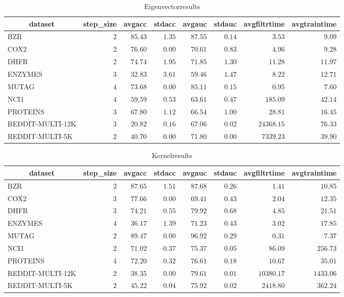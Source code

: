 \begin{table}[!tbp]
\caption{Eigenvectorresults\label{Eigenvectorresults}} 
{\centering
\begin{tabular}{lrrrrrrr}
\hline\hline
\multicolumn{1}{c}{dataset}&\multicolumn{1}{c}{step_size}&\multicolumn{1}{c}{avgacc}&\multicolumn{1}{c}{stdacc}&\multicolumn{1}{c}{avgauc}&\multicolumn{1}{c}{stdauc}&\multicolumn{1}{c}{avgfiltrtime}&\multicolumn{1}{c}{avgtraintime}\tabularnewline
\hline
BZR&$2$&$85.43$&$1.35$&$87.55$&$0.14$&$    3.53$&$ 9.09$\tabularnewline
COX2&$2$&$76.60$&$0.00$&$70.61$&$0.83$&$    4.96$&$ 9.28$\tabularnewline
DHFR&$2$&$74.74$&$1.95$&$71.85$&$1.30$&$   11.28$&$11.97$\tabularnewline
ENZYMES&$3$&$32.83$&$3.61$&$59.46$&$1.47$&$    8.22$&$12.71$\tabularnewline
MUTAG&$4$&$73.68$&$0.00$&$85.11$&$0.15$&$    0.95$&$ 7.60$\tabularnewline
NCI1&$4$&$59.59$&$0.53$&$63.61$&$0.47$&$  185.09$&$42.14$\tabularnewline
PROTEINS&$3$&$67.80$&$1.12$&$66.54$&$1.00$&$   28.81$&$16.45$\tabularnewline
REDDIT-MULTI-12K&$3$&$20.82$&$0.16$&$67.06$&$0.02$&$24368.15$&$76.33$\tabularnewline
REDDIT-MULTI-5K&$2$&$40.70$&$0.00$&$71.80$&$0.00$&$ 7339.23$&$39.90$\tabularnewline
\hline
\end{tabular}}
\end{table}
\begin{table}[!tbp]
\caption{Kernelresults\label{Kernelresults}} 
{\centering
\begin{tabular}{lrrrrrrr}
\hline\hline
\multicolumn{1}{c}{dataset}&\multicolumn{1}{c}{step_size}&\multicolumn{1}{c}{avgacc}&\multicolumn{1}{c}{stdacc}&\multicolumn{1}{c}{avgauc}&\multicolumn{1}{c}{stdauc}&\multicolumn{1}{c}{avgfiltrtime}&\multicolumn{1}{c}{avgtraintime}\tabularnewline
\hline
BZR&$2$&$87.65$&$1.51$&$87.68$&$0.26$&$    1.41$&$  10.85$\tabularnewline
COX2&$3$&$77.66$&$0.00$&$69.41$&$0.43$&$    2.04$&$  12.35$\tabularnewline
DHFR&$3$&$74.21$&$0.55$&$79.92$&$0.68$&$    4.85$&$  21.51$\tabularnewline
ENZYMES&$4$&$36.17$&$1.39$&$71.23$&$0.43$&$    3.02$&$  17.85$\tabularnewline
MUTAG&$2$&$89.47$&$0.00$&$96.92$&$0.29$&$    0.31$&$   7.37$\tabularnewline
NCI1&$2$&$71.02$&$0.37$&$75.37$&$0.05$&$   86.09$&$ 256.73$\tabularnewline
PROTEINS&$4$&$72.20$&$0.32$&$76.61$&$0.18$&$   10.67$&$  35.01$\tabularnewline
REDDIT-MULTI-12K&$2$&$38.35$&$0.00$&$79.61$&$0.01$&$10380.17$&$1433.06$\tabularnewline
REDDIT-MULTI-5K&$2$&$45.22$&$0.04$&$75.92$&$0.02$&$ 2418.80$&$ 362.24$\tabularnewline
\hline
\end{tabular}}
\end{table}
